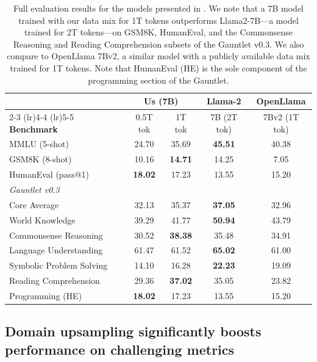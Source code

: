 \documentclass[10pt]{article} %
\begin{document}
\begin{table}[!htp]
    \centering
    \small
    \begin{tabular}{l c c c c} \toprule 
         &  \multicolumn{2}{c}{\textbf{Us} (7B)} & \textbf{Llama-2} & \textbf{OpenLlama}  \\
         \cmidrule(lr){2-3}
         \cmidrule(lr){4-4}
         \cmidrule(lr){5-5}
         \textbf{Benchmark}  & 0.5T tok & 1T tok & 7B (2T tok) &  7Bv2 (1T tok)   \\ \midrule 
         MMLU (5-shot)  & 24.70 & 35.69 & {\bf \color{c2} 45.51} & 40.38   \\
         GSM8K (8-shot) & 10.16 & {\bf \color{c2} 14.71} & 14.25 & 7.05   \\
         HumanEval (pass@1) & {\bf \color{c2} 18.02} & 17.23 & 13.55 & 15.20  \\
         \midrule
         \textit{Gauntlet v0.3} \\
         \quad Core Average & 32.13 & 35.37 & {\bf \color{c2} 37.05} & 32.96  \\
         \quad World Knowledge  &  39.29 & 41.77 &  {\bf \color{c2} 50.94} & 43.79   \\
         \quad Commonsense Reasoning  &  30.52 & {\bf \color{c2} 38.38} & 35.48  & 34.91 \\
         \quad Language Understanding & 61.47  & 61.52 &  {\bf \color{c2} 65.02} & 61.00  \\
         \quad Symbolic Problem Solving & 14.10 & 16.28 &  {\bf \color{c2} 22.23} & 19.09   \\
         \quad Reading Comprehension   & 29.36 & {\bf \color{c2} 37.02} & 35.05 & 23.82   \\
         \quad Programming (HE) & {\bf \color{c2} 18.02} & 17.23 & 13.55 & 15.20 \\
         \bottomrule
    \end{tabular}
    \caption{Full evaluation results for the models presented in .  We note that a 7B model trained with our data mix for 1T tokens outperforms Llama2-7B---a model trained for 2T tokens---on GSM8K, HumanEval, and the Commonsense Reasoning and Reading Comprehension subsets of the Gauntlet v0.3. We also compare to OpenLlama 7Bv2, a similar model with a publicly available data mix trained for 1T tokens.  Note that HumanEval (HE) is the sole component of the programming section of the Gauntlet.}
    \label{tab:data-mix-eval}
\end{table}


\subsection{Domain upsampling significantly boosts performance on challenging metrics}
\label{sec:du}
\end{document}
